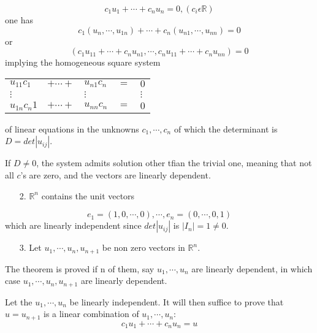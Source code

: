 \documentclass[11pt]{amsbook}
\begin{document}

\begin{equation*}
	c_1u_1+\cdots+c_nu_n=0,		(c_i\epsilon\mathbb{R})
\end{equation*}
one has
\begin{equation*}
	c_1(u_n,\cdots,u_{1n})+\cdots+c_n(u_{n1},\cdots,u_{nn}) = 0
\end{equation*}
or
\begin{equation*}
	(c_1u_{11}+\cdots+c_nu_{n1},\cdots,c_nu_{11}+\cdots+c_nu_{nn}) = 0
\end{equation*}
implying the homogeneous square system

\begin{center}
	\begin{tabular}{lllll}
		$u_{11}c_1$ & $+\cdots+$ & $u_{n1}c_n$ & $=$ & $0$ \\
		$\vdots$ & & $\vdots$ && $\vdots$ \\
		$u_{1n}c_n1$ & $+\cdots+$ & $u_{nn}c_n$ & $=$ & $0$
	\end{tabular}
\end{center}
of linear equations in the unknowns $c_1,\cdots,c_n$ of which the determinant is $D=det|u_{ij}|$.

If $D\neq0$, the system admits solution other tfian the trivial one, meaning that not all $c$'s are zero, and the vectors are linearly dependent.

\begin{enumerate}
	\item[2.] $\mathbb{R}^n$ contains the unit vectors
\end{enumerate}
\begin{equation*}
	e_1=(1,0,\cdots,0),\cdots,e_n=(0,\cdots,0,1)
\end{equation*}
which are linearly independent since $det|u_{ij}|$ is $|I_n| = 1 \neq 0$.

\begin{enumerate}
	\item[3.] Let $u_1,\cdots,u_n,u_{n+1}$ be non zero vectors in $\mathbb{R}^n$.
\end{enumerate}
The theorem is proved if n of them, say $u_1, \cdots,u_n$ are linearly dependent, in which case $u_1, \cdots,u_n,u_{n+1}$ are linearly dependent.

Let the $u_1,\cdots,u_n$ be linearly independent. It will then suffice to prove that $u=u_{n+1}$ is a linear combination of $u_1,\cdots,u_n$:
\begin{equation*}
	c_1u_1+\cdots+c_nu_n=u
\end{equation*}
\end{document}
